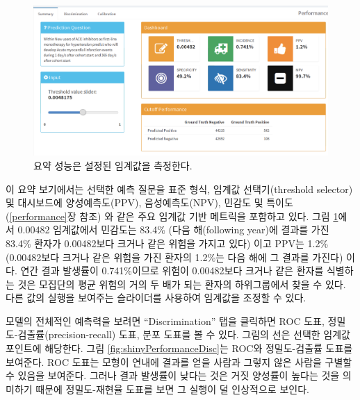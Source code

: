 \documentclass[11pt]{book}
\theoremstyle{definition}
\theoremstyle{definition}
\theoremstyle{definition}
\theoremstyle{remark}
\begin{document}
\begin{figure}

{\centering \includegraphics[width=1\linewidth]{images/PatientLevelPrediction/shiny/shinyPerformanceSum} 

}

\caption{요약 성능은 설정된 임계값을 측정한다.}\label{fig:shinyPerformanceSum}
\end{figure}

이 요약 보기에서는 선택한 예측 질문을 표준 형식, 임계값 선택기(threshold
selector) 및 대시보드에 양성예측도(PPV), 음성예측도(NPV), 민감도 및
특이도 (\ref{performance}장 참조) 와 같은 주요 임계값 기반 메트릭을
포함하고 있다. 그림 \ref{fig:shinyPerformanceSum}에서 0.00482 임계값에서
민감도는 83.4\% (다음 해(following year)에 결과를 가진 83.4\% 환자가
0.00482보다 크거나 같은 위험을 가지고 있다) 이고 PPV는 1.2\%
(0.00482보다 크거나 같은 위험을 가진 환자의 1.2\%는 다음 해에 그 결과를
가진다) 이다. 연간 결과 발생률이 0.741\%이므로 위험이 0.00482보다 크거나
같은 환자를 식별하는 것은 모집단의 평균 위험의 거의 두 배가 되는 환자의
하위그룹에서 찾을 수 있다. 다른 값의 실행을 보여주는 슬라이더를 사용하여
임계값을 조정할 수 있다.

모델의 전체적인 예측력을 보려면 ``Discrimination'' 탭을 클릭하면 ROC
도표, 정밀도-검출률(precision-recall) 도표, 분포 도표를 볼 수 있다.
그림의 선은 선택한 임계값 포인트에 해당한다. 그림
\ref{fig:shinyPerformanceDisc}는 ROC와 정밀도-검출률 도표를 보여준다.
ROC 도표는 모형이 연내에 결과를 얻을 사람과 그렇지 않은 사람을 구별할 수
있음을 보여준다. 그러나 결과 발생률이 낮다는 것은 거짓 양성률이 높다는
것을 의미하기 때문에 정밀도-재현율 도표를 보면 그 실행이 덜 인상적으로
보인다.
\end{document}

